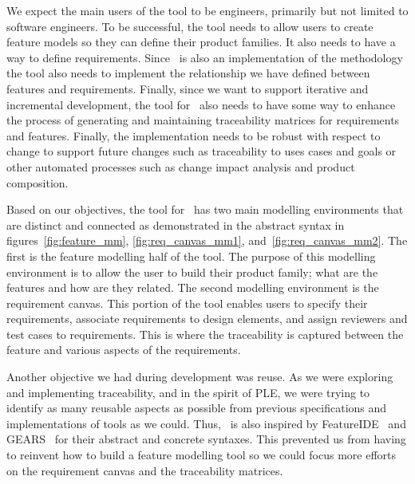 We expect the main users of the tool to be engineers, primarily but not limited to software engineers. To be successful, the tool needs to allow users to create feature models so they can define their product families. It also needs to have a way to define requirements. Since \tool\ is also an implementation of the methodology the tool also needs to implement the relationship we have defined between features and requirements. Finally, since we want to support iterative and incremental development, the tool for \tool\ also needs to have some way to enhance the process of generating and maintaining traceability matrices for requirements and features. Finally, the implementation needs to be robust with respect to change to support future changes such as traceability to uses cases and goals or other automated processes such as change impact analysis and product composition.

Based on our objectives, the tool for \tool\ has two main modelling environments that are distinct and connected as demonstrated in the abstract syntax in figures~\ref{fig:feature_mm}, \ref{fig:req_canvas_mm1}, and~\ref{fig:req_canvas_mm2}. The first is the feature modelling half of the tool. The purpose of this modelling environment is to allow the user to build their product family; what are the features and how are they related. The second modelling environment is the requirement canvas. This portion of the tool enables users to specify their requirements, associate requirements to design elements, and assign reviewers and test cases to requirements. This is where the traceability is captured between the feature and various aspects of the requirements. 

Another objective we had during development was reuse. As we were exploring and implementing traceability, and in the spirit of \ac{PLE}, we were trying to identify as many reusable aspects as possible from previous specifications and implementations of tools as we could. Thus, \tool\ is also inspired by FeatureIDE~\cite{kastner2009featureide, thum2014featureide} and GEARS~\cite{GEARS} for their abstract and concrete syntaxes. This prevented us from having to reinvent how to build a feature modelling tool so we could focus more efforts on the requirement canvas and the traceability matrices.

